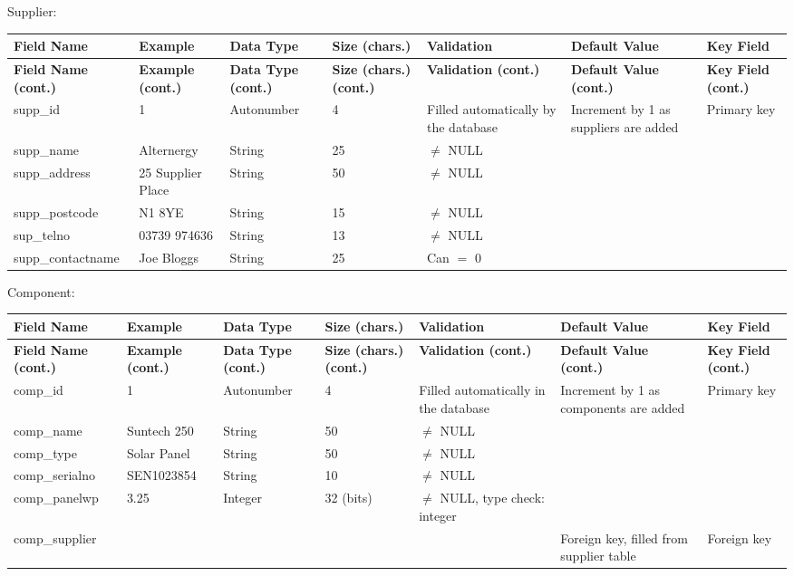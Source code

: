 Supplier:
\begin{center}
	\begin{longtable}{ | p{3cm} | p{3cm} | p{2cm} | p{1cm} | p{2cm} | p{2cm} | p{2cm} | }
		\hline
		\textbf{Field Name} & \textbf{Example} & \textbf{Data Type}
& \textbf{Size (chars.)} & \textbf{Validation} & \textbf{Default Value} & \textbf{Key Field}\\
		\endfirsthead
		\hline
		\textbf{Field Name (cont.)} & \textbf{Example (cont.)} &
\textbf{Data Type (cont.)} & \textbf{Size (chars.) (cont.)} & \textbf{Validation (cont.)} & \textbf{Default Value (cont.)} & \textbf{Key Field (cont.)}\\
		\endhead
		\hline
		supp\_id & 1 & Autonumber & 4 & Filled automatically by the database & Increment by 1 as suppliers are added & Primary key\\
		\hline
		supp\_name & Alternergy & String & 25 & $\neq$ NULL & &\\
		\hline
		supp\_address & 25 Supplier Place & String & 50 & $\neq$ NULL & &\\
		\hline
		supp\_postcode & N1 8YE & String & 15 & $\neq$ NULL & &\\
		\hline
		sup\_telno & 03739 974636 & String & 13 & $\neq$ NULL & &\\
		\hline
		supp\_contactname & Joe Bloggs & String & 25 & Can $=$ 0 & &\\
		\hline
	\end{longtable}
\end{center}

Component:
\begin{center}
	\begin{longtable}{ | p{3cm} | p{3cm} | p{2cm} | p{1cm} | p{2cm} | p{2cm} | p{2cm} | }
		\hline
		\textbf{Field Name} & \textbf{Example} & \textbf{Data Type}
& \textbf{Size (chars.)} & \textbf{Validation} & \textbf{Default Value} & \textbf{Key Field}\\
		\endfirsthead
		\hline
		\textbf{Field Name (cont.)} & \textbf{Example (cont.)} &
\textbf{Data Type (cont.)} & \textbf{Size (chars.) (cont.)} & \textbf{Validation (cont.)} & \textbf{Default Value (cont.)} & \textbf{Key Field (cont.)}\\
		\endhead
		\hline
		comp\_id & 1 & Autonumber & 4 & Filled automatically in the database & Increment by 1 as components are added & Primary key\\
		\hline
		comp\_name & Suntech 250 & String & 50 & $\neq$ NULL & &\\
		\hline
		comp\_type & Solar Panel & String & 50 & $\neq$ NULL & &\\
		\hline
		comp\_serialno & SEN1023854 & String & 10 & $\neq$ NULL & &\\
		\hline
		comp\_panelwp & 3.25 & Integer & 32 (bits) & $\neq$ NULL, type check: integer & &\\
		\hline
		comp\_supplier & & & & & Foreign key, filled from supplier table & Foreign key\\
		\hline
	\end{longtable}
\end{center}


